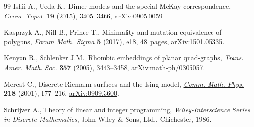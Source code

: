 \documentclass[11pt]{article}
\numberwithin{equation}{section}
\numberwithin{equation}{section}
\numberwithin{figure}{section}
\numberwithin{table}{section}
\begin{document}
\begin{thebibliography}{99}
Ishii A., Ueda K., Dimer models and the special {M}c{K}ay correspondence,
 \href{https://doi.org/10.2140/gt.2015.19.3405}{\textit{Geom. Topol.}} \textbf{19} (2015), 3405--3466, \href{https://arxiv.org/abs/0905.0059}{arXiv:0905.0059}.

Kasprzyk A., Nill B., Prince T., Minimality and mutation-equivalence of
 polygons, \href{https://doi.org/10.1017/fms.2017.10}{\textit{Forum Math. Sigma}} \textbf{5} (2017), e18, 48~pages,
 \href{https://arxiv.org/abs/1501.05335}{arXiv:1501.05335}.

Kenyon R., Schlenker J.M., Rhombic embeddings of planar quad-graphs,
 \href{https://doi.org/10.1090/S0002-9947-04-03545-7}{\textit{Trans. Amer. Math. Soc.}} \textbf{357} (2005), 3443--3458,
 \href{https://arxiv.org/abs/math-ph/0305057}{arXiv:math-ph/0305057}.

Mercat C., Discrete {R}iemann surfaces and the {I}sing model, \href{https://doi.org/10.1007/s002200000348}{\textit{Comm.
 Math. Phys.}} \textbf{218} (2001), 177--216, \href{https://arxiv.org/abs/0909.3600}{arXiv:0909.3600}.

Schrijver A., Theory of linear and integer programming, \textit{Wiley-Interscience
 Series in Discrete Mathematics}, John Wiley \& Sons, Ltd., Chichester, 1986.

\end{thebibliography}
\end{document}
